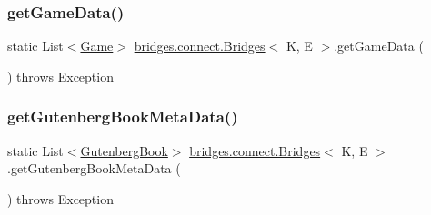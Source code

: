 \hypertarget{classbridges_1_1connect_1_1_bridges_abcd1c3465d8963cd635a63e248f33525}{}\label{classbridges_1_1connect_1_1_bridges_abcd1c3465d8963cd635a63e248f33525} 
\subsubsection{\texorpdfstring{get\+Game\+Data()}{getGameData()}}
{\footnotesize\ttfamily static List$<$\hyperlink{classbridges_1_1data__src__dependent_1_1_game}{Game}$>$ \hyperlink{classbridges_1_1connect_1_1_bridges}{bridges.\+connect.\+Bridges}$<$ K, E $>$.get\+Game\+Data (\begin{DoxyParamCaption}{ }\end{DoxyParamCaption}) throws Exception\hspace{0.3cm}{\ttfamily [static]}}

\hypertarget{classbridges_1_1connect_1_1_bridges_a123d445316be7e9927b5642a3b8c71ba}{}\label{classbridges_1_1connect_1_1_bridges_a123d445316be7e9927b5642a3b8c71ba} 
\subsubsection{\texorpdfstring{get\+Gutenberg\+Book\+Meta\+Data()}{getGutenbergBookMetaData()}}
{\footnotesize\ttfamily static List$<$\hyperlink{classbridges_1_1data__src__dependent_1_1_gutenberg_book}{Gutenberg\+Book}$>$ \hyperlink{classbridges_1_1connect_1_1_bridges}{bridges.\+connect.\+Bridges}$<$ K, E $>$.get\+Gutenberg\+Book\+Meta\+Data (\begin{DoxyParamCaption}{ }\end{DoxyParamCaption}) throws Exception\hspace{0.3cm}{\ttfamily [static]}}

\hypertarget{classbridges_1_1connect_1_1_bridges_a813a1783f7b547fdb964f8af87c66f4b}{}\label{classbridges_1_1connect_1_1_bridges_a813a1783f7b547fdb964f8af87c66f4b} 
